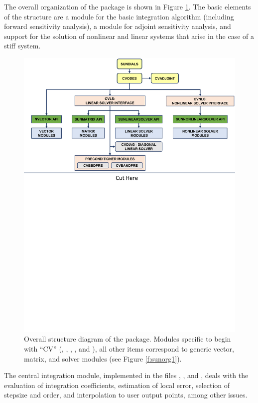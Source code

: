 The overall organization of the {\cvodes} package is shown in Figure
\ref{f:cvsorg}.
The basic elements of the structure are a module for
the basic integration algorithm (including forward sensitivity analysis),
a module for adjoint sensitivity analysis, and support for the solution
of nonlinear and linear systems that arise in the case of a stiff system.
\begin{figure}[!htb]
{\centerline{\includegraphics[width=\textwidth]{cvsorg}}}
\caption [Overall structure diagram of the {\cvodes} package]
{Overall structure diagram of the {\cvodes} package.
  Modules specific to {\cvodes} begin with ``CV'' ({\cvls}, {\cvnls}, {\cvdiag},
  {\cvbbdpre}, and {\cvbandpre}), all other items correspond to generic
  {\sundials} vector, matrix, and solver modules (see Figure \ref{f:sunorg1}).}
\label{f:cvsorg}
\end{figure}
The central integration module, implemented in the files ,
, and , deals with the evaluation of integration
coefficients, estimation of local
error, selection of stepsize and order, and interpolation to user output
points, among other issues.

